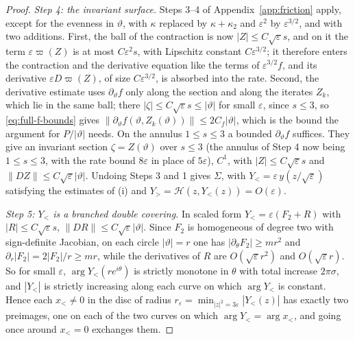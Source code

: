 \documentclass[11pt,reqno]{amsart}
\theoremstyle{plain}
\theoremstyle{definition}
\theoremstyle{remark}
\begin{document}
\begin{proof}
\emph{Step 4: the invariant surface.} Steps 3--4 of Appendix~\ref{app:friction} apply, except for the evenness in $\vartheta$, with $\kappa$
replaced by $\kappa+\kappa_2$ and $\varepsilon^{2}$ by $\varepsilon^{3/2}$, and with two additions. First, the ball of the contraction
is now $|Z|\le C\sqrt\varepsilon s$, and on it the term $\varepsilon\varpi(Z)$ is at most $C\varepsilon^{2}s$, with Lipschitz constant $C\varepsilon^{3/2}$; it
therefore enters the contraction and the derivative equation like the terms of $\varepsilon^{3/2}f$, and its derivative $\varepsilon D\varpi(Z)$,
of size $C\varepsilon^{3/2}$, is absorbed into the rate. Second, the derivative estimate uses $\partial_\vartheta f$ only along the section and
along the iterates $Z_k$, which lie in the same ball; there $|\zeta|\le C\sqrt\varepsilon s\le|\vartheta|$ for small $\varepsilon$, since $s\le3$, so
\eqref{eq:full-f-bounds} gives $\|\partial_\vartheta f(\vartheta,Z_k(\vartheta))\|\le2C_f|\vartheta|$, which is the bound the argument for $P/|\vartheta|$ needs. On the annulus
$1\le s\le3$ a bounded $\partial_\vartheta f$ suffices. They give an invariant section $\zeta=Z(\vartheta)$ over $s\le3$ (the annulus of Step 4 now being $1\le s\le3$, with the
rate bound $8\varepsilon$ in place of $5\varepsilon$), $C^{1}$, with
$|Z|\le C\sqrt\varepsilon s$ and $\|DZ\|\le C\sqrt\varepsilon|\vartheta|$. Undoing Steps 3 and 1 gives $\Sigma$, with $Y_<=\varepsilon\,y(z/\sqrt\varepsilon)$ satisfying
the estimates of (i) and $Y_>=\mathcal H(z,Y_<(z))=O(\varepsilon)$.

\emph{Step 5: $Y_<$ is a branched double covering.} In scaled form $Y_<=\varepsilon(F_2+R)$ with $|R|\le C\sqrt\varepsilon s$,
$\|DR\|\le C\sqrt\varepsilon|\vartheta|$. Since $F_2$ is homogeneous of degree two with sign-definite Jacobian, on each circle $|\vartheta|=r$ one
has $|\partial_\theta F_2|\ge mr^{2}$ and $\partial_r|F_2|=2|F_2|/r\ge mr$, while the derivatives of $R$ are $O(\sqrt\varepsilon r^{2})$ and
$O(\sqrt\varepsilon r)$. So for small $\varepsilon$, $\arg Y_<(re^{i\theta})$ is strictly monotone in $\theta$ with total increase $2\pi\sigma$, and
$|Y_<|$ is strictly increasing along each curve on which $\arg Y_<$ is constant. Hence each $x_<\ne0$ in the disc of
radius $r_\varepsilon=\min_{|z|^{2}=3\varepsilon}|Y_<(z)|$ has exactly two preimages, one on each of the two curves on which $\arg Y_<=\arg x_<$,
and going once around $x_<=0$ exchanges them.


\end{proof}
\end{document}
